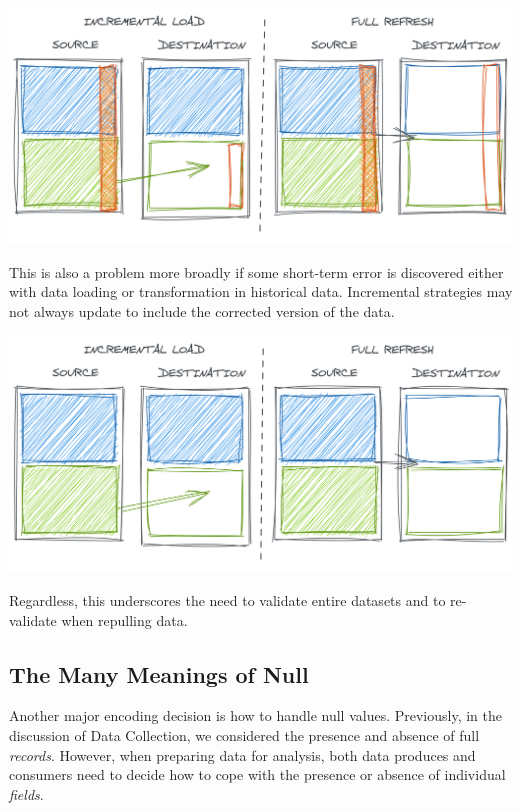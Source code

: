 \documentclass[
]{krantz}
\begin{document}
\begin{center}\includegraphics[width=0.9\linewidth]{figures/data-dall/incr-full-bad-col} \end{center}

This is also a problem more broadly if some short-term error is discovered either with data loading or transformation in historical data. Incremental strategies may not always update to include the corrected version of the data.

\begin{center}\includegraphics[width=0.9\linewidth]{figures/data-dall/incr-full-good} \end{center}

Regardless, this underscores the need to validate entire datasets and to re-validate when repulling data.

\hypertarget{the-many-meanings-of-null}{%
\subsection{The Many Meanings of Null}\label{the-many-meanings-of-null}}

Another major encoding decision is how to handle null values.
Previously, in the discussion of Data Collection, we considered the presence and absence of full \emph{records}.
However, when preparing data for analysis, both data produces and consumers need to decide how to cope with the presence or absence of individual \emph{fields}.
\end{document}
